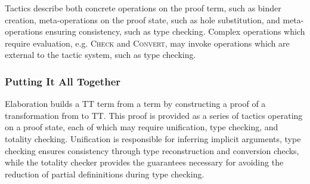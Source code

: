 Tactics describe both concrete operations on the proof term, such as binder
creation, meta-operations on the proof state, such as hole substitution, and
meta-operations ensuring consistency, such as type checking. Complex
operations which require evaluation, e.g. \textsc{Check} and \textsc{Convert},
may invoke operations which are external to the tactic system, such as type
checking.

\subsubsection{Putting It All Together}
Elaboration builds a TT term from a \IdrisM{} term by constructing a proof of a
transformation from \IdrisM{} to TT. This proof is provided as a series of
tactics operating on a proof state, each of which may require unification, type
checking, and totality checking. Unification is responsible for inferring
implicit arguments, type checking ensures consistency through type
reconstruction and conversion checks, while the totality checker provides the
guarantees necessary for avoiding the reduction of partial defininitions during
type checking.











